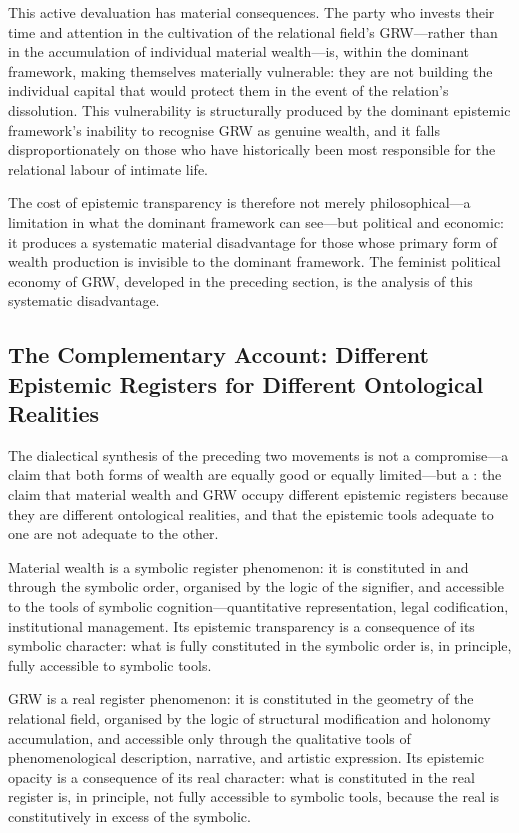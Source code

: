 This active devaluation has material consequences. The party who invests their time and attention in the cultivation of the relational field's GRW---rather than in the accumulation of individual material wealth---is, within the dominant framework, making themselves materially vulnerable: they are not building the individual capital that would protect them in the event of the relation's dissolution. This vulnerability is structurally produced by the dominant epistemic framework's inability to recognise GRW as genuine wealth, and it falls disproportionately on those who have historically been most responsible for the relational labour of intimate life.

The cost of epistemic transparency is therefore not merely philosophical---a limitation in what the dominant framework can see---but political and economic: it produces a systematic material disadvantage for those whose primary form of wealth production is invisible to the dominant framework. The feminist political economy of GRW, developed in the preceding section, is the analysis of this systematic disadvantage.

\subsection{The Complementary Account: Different Epistemic Registers for Different Ontological Realities}
\label{p15:subsec:complementary}

\noindent
The dialectical synthesis of the preceding two movements is not a compromise---a claim that both forms of wealth are equally good or equally limited---but a : the claim that material wealth and GRW occupy different epistemic registers because they are different ontological realities, and that the epistemic tools adequate to one are not adequate to the other.

Material wealth is a symbolic register phenomenon: it is constituted in and through the symbolic order, organised by the logic of the signifier, and accessible to the tools of symbolic cognition---quantitative representation, legal codification, institutional management. Its epistemic transparency is a consequence of its symbolic character: what is fully constituted in the symbolic order is, in principle, fully accessible to symbolic tools.

GRW is a real register phenomenon: it is constituted in the geometry of the relational field, organised by the logic of structural modification and holonomy accumulation, and accessible only through the qualitative tools of phenomenological description, narrative, and artistic expression. Its epistemic opacity is a consequence of its real character: what is constituted in the real register is, in principle, not fully accessible to symbolic tools, because the real is constitutively in excess of the symbolic.

